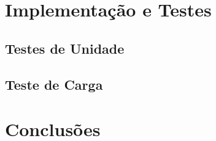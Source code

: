 \documentclass[
  10.5pt,				  %
	openright,			%
	twoside,			  %
  a5paper,
  chapter=TITLE,	%
	section=TITLE,	%
  hyphens,        %
	english,        %
	brazil          %
]{abntex2}
\begin{document}
\chapter{Implementação e Testes}

\section{Testes de Unidade}

\section{Teste de Carga}



\chapter{Conclusões}





%
\end{document}
